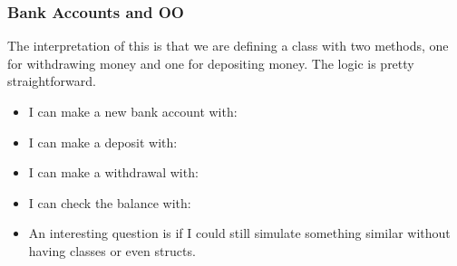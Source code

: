 \documentclass{beamer}
\begin{document}




\begin{frame}
  \frametitle{Bank Accounts and OO}
  The interpretation of this is that we are defining
  a class with two methods, one for withdrawing money and one for depositing
  money. The logic is pretty straightforward. 
  \begin{itemize}
  \item<2-> I can make a new bank account with:
    \newAcc
  \item<3-> I can make a deposit with:
    \deposit
  \item<4-> I can make a withdrawal with:
    \withdraw
  \item<5-> I can check the balance with:
    \balance
  \item<6-> An interesting question is if I could still simulate something
    similar without having classes or even structs.
  \end{itemize}
\end{frame}



\end{document}
